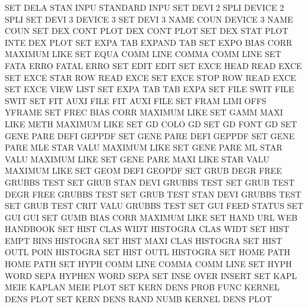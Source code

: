 SET      DELA STAN INPU                 STANDARD INPU
SET      DEVI 2    SPLI                 DEVICE   2    SPLI 
SET      DEVI 3                         DEVICE   3
SET      DEVI 3    NAME COUN            DEVICE   3    NAME COUN
SET      DEX  CONT PLOT                 DEX      CONT PLOT
SET      DEX  STAT PLOT INTE            DEX      PLOT
SET      EXPA TAB                       EXPAND   TAB
SET      EXPO BIAS CORR                 MAXIMUM  LIKE
SET      EQUA COMM LINE                 COMMA    COMM LINE
SET      FATA ERRO                      FATAL    ERRO
SET      EDIT                           EDIT
SET      EXCE HEAD                      READ     EXCE
SET      EXCE STAR ROW                  READ     EXCE
SET      EXCE STOP ROW                  READ     EXCE
SET      EXCE VIEW                      LIST
SET      EXPA TAB                       TAB      EXPA
SET      FILE SWIT                      FILE     SWIT
SET      FIT  AUXI FILE                 FIT      AUXI FILE
SET      FRAM LIMI OFFS                 YFRAME
SET      FREC BIAS CORR                 MAXIMUM  LIKE
SET      GAMM MAXI LIKE METH            MAXIMUM  LIKE
SET      GD   COLO                      GD
SET      GD   FONT                      GD
SET      GENE PARE DEFI                 GEPPDF
SET      GENE PARE DEFI                 GEPPDF
SET      GENE PARE MLE  STAR VALU       MAXIMUM  LIKE
SET      GENE PARE ML   STAR VALU       MAXIMUM  LIKE
SET      GENE PARE MAXI LIKE STAR VALU  MAXIMUM  LIKE
SET      GEOM DEFI                      GEOPDF
SET      GRUB DEGR FREE                 GRUBBS   TEST
SET      GRUB STAN DEVI                 GRUBBS   TEST
SET      GRUB TEST DEGR FREE            GRUBBS   TEST
SET      GRUB TEST STAN DEVI            GRUBBS   TEST
SET      GRUB TEST CRIT VALU            GRUBBS   TEST
SET      GUI  FEED                      STATUS
SET      GUI                            GUI
SET      GUMB BIAS CORR                 MAXIMUM  LIKE
SET      HAND URL                       WEB      HANDBOOK
SET      HIST CLAS WIDT                 HISTOGRA CLAS WIDT
SET      HIST EMPT BINS                 HISTOGRA
SET      HIST MAXI CLAS                 HISTOGRA
SET      HIST OUTL POIN                 HISTOGRA
SET      HIST OUTL                      HISTOGRA
SET      HOME PATH                      HOME     PATH
SET      HYPH COMM LINE                 COMMA    COMM LINE
SET      HYPH WORD SEPA                 HYPHEN   WORD SEPA
SET      INSE OVER                      INSERT
SET      KAPL MEIE                      KAPLAN   MEIE PLOT
SET      KERN DENS PROB FUNC            KERNEL   DENS PLOT
SET      KERN DENS RAND NUMB            KERNEL   DENS PLOT
